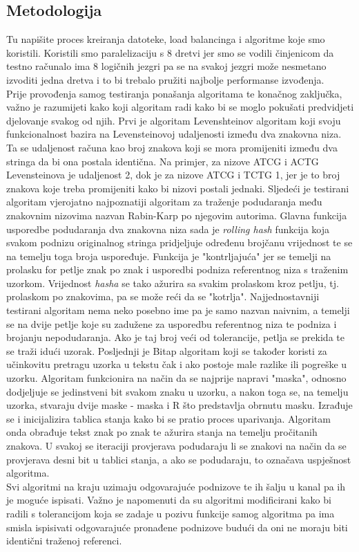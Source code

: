 \documentclass[conference]{IEEEtran}
\begin{document}
\subsection{Metodologija}
Tu napišite proces kreiranja datoteke, load balancinga i algoritme koje smo koristili.
Koristili smo paralelizaciju s 8 dretvi jer smo se vodili činjenicom da testno računalo ima 8 logičnih jezgri pa se na svakoj jezgri može nesmetano izvoditi jedna dretva i to bi trebalo pružiti najbolje performanse izvođenja.\\
Prije provođenja samog testiranja ponašanja algoritama te konačnog zaključka, važno je razumijeti kako koji algoritam radi kako bi se moglo pokušati predvidjeti djelovanje svakog od njih. Prvi je algoritam Levenshteinov algoritam koji svoju funkcionalnost bazira na Levensteinovoj udaljenosti između dva znakovna niza. Ta se udaljenost računa kao broj znakova koji se mora promijeniti između dva stringa da bi ona postala identična. Na primjer, za nizove ATCG i ACTG Levensteinova je udaljenost 2, dok je za nizove ATCG i TCTG 1, jer je to broj znakova koje treba promijeniti kako bi nizovi postali jednaki. Sljedeći je testirani algoritam vjerojatno najpoznatiji algoritam za traženje podudaranja među znakovnim nizovima nazvan Rabin-Karp po njegovim autorima. Glavna funkcija usporedbe podudaranja dva znakovna niza sada je \textit{rolling hash} funkcija koja svakom podnizu originalnog stringa pridjeljuje određenu brojčanu vrijednost te se na temelju toga broja uspoređuje. Funkcija je "kontrljajuća" jer se temelji na prolasku for petlje znak po znak i usporedbi podniza referentnog niza s traženim uzorkom. Vrijednost \textit{hasha} se tako ažurira sa svakim prolaskom kroz petlju, tj. prolaskom po znakovima, pa se može reći da se "kotrlja". Najjednostavniji testirani algoritam nema neko posebno ime pa je samo nazvan naivnim, a temelji se na dvije petlje koje su zadužene za usporedbu referentnog niza te podniza i brojanju nepodudaranja. Ako je taj broj veći od tolerancije, petlja se prekida te se traži idući uzorak.
Posljednji je Bitap algoritam koji se također koristi za učinkovitu pretragu uzorka u tekstu čak i ako postoje male razlike ili pogreške u uzorku. Algoritam funkcionira na način da se  najprije napravi "maska", odnosno dodjeljuje se jedinstveni bit svakom znaku u uzorku, a nakon toga se, na temelju uzorka, stvaraju dvije maske - maska i R što predstavlja obrnutu masku. Izrađuje se i inicijalizira tablica stanja kako bi se pratio proces uparivanja. Algoritam onda obrađuje tekst znak po znak te ažurira stanja na temelju pročitanih znakova. U svakoj se iteraciji provjerava podudaraju li se znakovi na način da se provjerava desni bit u tablici stanja, a ako se podudaraju, to označava uspješnost algoritma.\\
Svi algoritmi na kraju uzimaju odgovarajuće podnizove te ih šalju u kanal pa ih je moguće ispisati. Važno je napomenuti da su algoritmi modificirani kako bi radili s tolerancijom koja se zadaje u pozivu funkcije samog algoritma pa ima smisla ispisivati odgovarajuće pronađene podnizove budući da oni ne moraju biti identični traženoj referenci.
\end{document}

